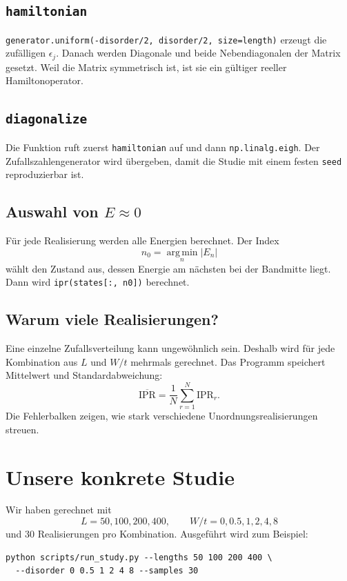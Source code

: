 \documentclass[11pt,a4paper]{article}
\begin{document}
\subsection{\texttt{hamiltonian}}
\texttt{generator.uniform(-disorder/2, disorder/2, size=length)} erzeugt
die zufälligen $\epsilon_j$. Danach werden Diagonale und beide
Nebendiagonalen der Matrix gesetzt. Weil die Matrix symmetrisch ist, ist sie
ein gültiger reeller Hamiltonoperator.

\subsection{\texttt{diagonalize}}
Die Funktion ruft zuerst \texttt{hamiltonian} auf und dann
\texttt{np.linalg.eigh}. Der Zufallszahlengenerator wird übergeben, damit
die Studie mit einem festen \texttt{seed} reproduzierbar ist.

\subsection{Auswahl von $E\approx0$}
Für jede Realisierung werden alle Energien berechnet. Der Index
\[
 n_0=\operatorname*{arg\,min}_n |E_n|
\]
wählt den Zustand aus, dessen Energie am nächsten bei der Bandmitte liegt.
Dann wird \texttt{ipr(states[:, n0])} berechnet.

\subsection{Warum viele Realisierungen?}
Eine einzelne Zufallsverteilung kann ungewöhnlich sein. Deshalb wird für
jede Kombination aus $L$ und $W/t$ mehrmals gerechnet. Das Programm
speichert Mittelwert und Standardabweichung:
\[
 \overline{\mathrm{IPR}}=\frac1N\sum_{r=1}^N\mathrm{IPR}_r.
\]
Die Fehlerbalken zeigen, wie stark verschiedene Unordnungsrealisierungen
streuen.

\section{Unsere konkrete Studie}
Wir haben gerechnet mit
\[
 L=50,100,200,400,\qquad
 W/t=0,0.5,1,2,4,8
\]
und 30 Realisierungen pro Kombination. Ausgeführt wird zum Beispiel:
\begin{verbatim}
python scripts/run_study.py --lengths 50 100 200 400 \
  --disorder 0 0.5 1 2 4 8 --samples 30
\end{verbatim}
\end{document}
